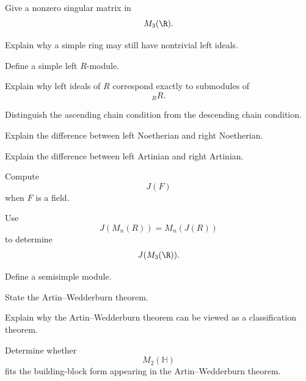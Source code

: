 \begin{exercise}[2]
Give a nonzero singular matrix in
\[ M_3(\R). \]
\end{exercise}

\begin{exercise}[2]
Explain why a simple ring may still have nontrivial left ideals.
\end{exercise}

\begin{exercise}[1]
Define a simple left \(R\)-module.
\end{exercise}

\begin{exercise}[2]
Explain why left ideals of \(R\) correspond exactly to submodules of
\[ {}_RR. \]
\end{exercise}

\begin{exercise}[1]
Distinguish the ascending chain condition from the descending chain
condition.
\end{exercise}

\begin{exercise}[2]
Explain the difference between left Noetherian and right Noetherian.
\end{exercise}

\begin{exercise}[2]
Explain the difference between left Artinian and right Artinian.
\end{exercise}

\begin{exercise}[1]
Compute
\[ J(F) \]
when \(F\) is a field.
\end{exercise}

\begin{exercise}[2]
Use
\[ J(M_n(R))=M_n(J(R)) \]
to determine
\[ J(M_3(\R)). \]
\end{exercise}

\begin{exercise}[1]
Define a semisimple module.
\end{exercise}

\begin{exercise}[1]
State the Artin--Wedderburn theorem.
\end{exercise}

\begin{exercise}[2]
Explain why the Artin--Wedderburn theorem can be viewed as a classification
theorem.
\end{exercise}

\begin{exercise}[2]
Determine whether
\[ M_2(\mathbb H) \]
fits the building-block form appearing in the Artin--Wedderburn theorem.
\end{exercise}

